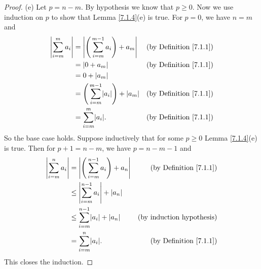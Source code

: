 \begin{proof}{(e)}
    Let \(p = n - m\).
    By hypothesis we know that \(p \geq 0\).
    Now we use induction on \(p\) to show that Lemma \ref{7.1.4}(e) is true.
    For \(p = 0\), we have \(n = m\) and
    \begin{align*}
        \abs*{\sum_{i = m}^m a_i} & = \abs*{\Bigg(\sum_{i = m}^{m - 1} a_i\Bigg) + a_m}        & \text{(by Definition \ref{7.1.1})} \\
                                  & = \abs*{0 + a_m}                                           & \text{(by Definition \ref{7.1.1})} \\
                                  & = 0 + \abs*{a_m}                                                                                \\
                                  & = \Bigg(\sum_{i = m}^{m - 1} \abs*{a_i}\Bigg) + \abs*{a_m} & \text{(by Definition \ref{7.1.1})} \\
                                  & = \sum_{i = m}^m \abs*{a_i}.                               & \text{(by Definition \ref{7.1.1})}
    \end{align*}
    So the base case holds.
    Suppose inductively that for some \(p \geq 0\) Lemma \ref{7.1.4}(e) is true.
    Then for \(p + 1 = n - m\), we have \(p = n - m - 1\) and
    \begin{align*}
        \abs*{\sum_{i = m}^n a_i} & = \abs*{\Bigg(\sum_{i = m}^{n - 1} a_i\Bigg) + a_n} & \text{(by Definition \ref{7.1.1})} \\
                                  & \leq \abs*{\sum_{i = m}^{n - 1} a_i} + \abs*{a_n}                                        \\
                                  & \leq \sum_{i = m}^{n - 1} \abs*{a_i} + \abs*{a_n}   & \text{(by induction hypothesis)}   \\
                                  & = \sum_{i = m}^n \abs*{a_i}.                        & \text{(by Definition \ref{7.1.1})}
    \end{align*}
    This closes the induction.
\end{proof}

